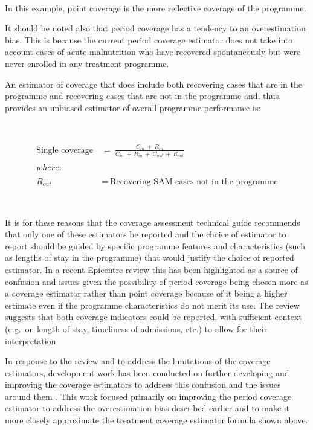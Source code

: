 \documentclass[12pt,a4paper]{book}
\theoremstyle{definition}
\theoremstyle{definition}
\theoremstyle{definition}
\theoremstyle{remark}
\begin{document}
~

In this example, point coverage is the more reflective coverage of the
programme.

It should be noted also that period coverage has a tendency to an
overestimation bias. This is because the current period coverage
estimator does not take into account cases of acute malnutrition who
have recovered spontaneously but were never enrolled in any treatment
programme.

An estimator of coverage that does include both recovering cases that
are in the programme and recovering cases that are not in the programme
and, thus, provides an unbiased estimator of overall programme
performance is:

~

\[\begin{aligned}
\text{Single coverage} & ~ = ~ \frac{C_{in} ~ + ~ R_{in}}{C_{in} ~ + ~ R_{in} ~ + ~ C_{out} ~ + ~ R_{out}} \\
\\
where: & \\
\\
R_{out} & ~ = ~ \text{Recovering SAM cases not in the programme}
\end{aligned}\]

~

It is for these reasons that the coverage assessment technical guide
\citep{Myatt:2012tt} recommends that only one of these estimators be
reported and the choice of estimator to report should be guided by
specific programme features and characteristics (such as lengths of stay
in the programme) that would justify the choice of reported estimator.
In a recent Epicentre review \citep{Epicentre:2015ty} this has been
highlighted as a source of confusion and issues given the possibility of
period coverage being chosen more as a coverage estimator rather than
point coverage because of it being a higher estimate even if the
programme characteristics do not merit its use. The review suggests that
both coverage indicators could be reported, with sufficient context
(e.g.~on length of stay, timeliness of admissions, etc.) to allow for
their interpretation.

In response to the review and to address the limitations of the coverage
estimators, development work has been conducted on further developing
and improving the coverage estimators to address this confusion and the
issues around them \citep{Balegamire:2015ud}. This work focused
primarily on improving the period coverage estimator to address the
overestimation bias described earlier and to make it more closely
approximate the treatment coverage estimator formula shown above.
\end{document}
